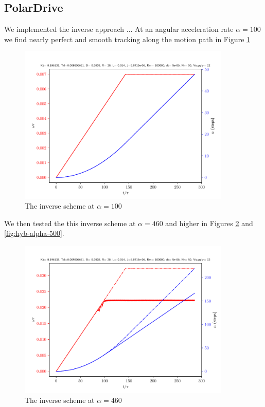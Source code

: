 \documentclass{article}
\begin{document}
\subsection{PolarDrive}
We implemented the inverse approach ... At an angular acceleration rate $\alpha=100$ we find nearly perfect and smooth tracking along the motion path in Figure \ref{fig:hyb-alpha-100}
\begin{figure}[h!]
  \centering
  \includegraphics[width=0.9\textwidth]{simfigs/fig1-2018-10-20T14-13-59-hybrid-accel-False-alpha-100.pdf}
  \captionsetup{justification=centering}
  \caption{The inverse scheme at $\alpha=100$}
   \label{fig:hyb-alpha-100}
\end{figure}
We then tested the this inverse scheme at $\alpha=460$ and higher in Figures \ref{fig:hyb-alpha-460} and \ref{fig:hyb-alpha-500}. 
\begin{figure}[h!]
  \centering
  \includegraphics[width=0.9\textwidth]{simfigs/fig1-2018-10-20T14-24-16-hybrid-accel-False-alpha-460.pdf}
  \captionsetup{justification=centering}
  \caption{The inverse scheme at $\alpha=460$}
   \label{fig:hyb-alpha-460}
\end{figure}
\end{document}

